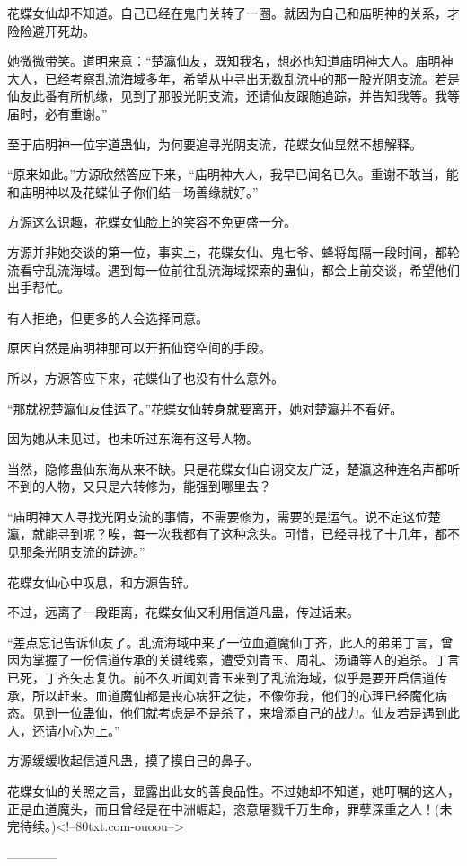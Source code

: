 \begin{this_body}
花蝶女仙却不知道。自己已经在鬼门关转了一圈。就因为自己和庙明神的关系，才险险避开死劫。

她微微带笑。道明来意：“楚瀛仙友，既知我名，想必也知道庙明神大人。庙明神大人，已经考察乱流海域多年，希望从中寻出无数乱流中的那一股光阴支流。若是仙友此番有所机缘，见到了那股光阴支流，还请仙友跟随追踪，并告知我等。我等届时，必有重谢。”

至于庙明神一位宇道蛊仙，为何要追寻光阴支流，花蝶女仙显然不想解释。

“原来如此。”方源欣然答应下来，“庙明神大人，我早已闻名已久。重谢不敢当，能和庙明神以及花蝶仙子你们结一场善缘就好。”

方源这么识趣，花蝶女仙脸上的笑容不免更盛一分。

方源并非她交谈的第一位，事实上，花蝶女仙、鬼七爷、蜂将每隔一段时间，都轮流看守乱流海域。遇到每一位前往乱流海域探索的蛊仙，都会上前交谈，希望他们出手帮忙。

有人拒绝，但更多的人会选择同意。

原因自然是庙明神那可以开拓仙窍空间的手段。

所以，方源答应下来，花蝶仙子也没有什么意外。

“那就祝楚瀛仙友佳运了。”花蝶女仙转身就要离开，她对楚瀛并不看好。

因为她从未见过，也未听过东海有这号人物。

当然，隐修蛊仙东海从来不缺。只是花蝶女仙自诩交友广泛，楚瀛这种连名声都听不到的人物，又只是六转修为，能强到哪里去？

“庙明神大人寻找光阴支流的事情，不需要修为，需要的是运气。说不定这位楚瀛，就能寻到呢？唉，每一次我都有了这种念头。可惜，已经寻找了十几年，都不见那条光阴支流的踪迹。”

花蝶女仙心中叹息，和方源告辞。

不过，远离了一段距离，花蝶女仙又利用信道凡蛊，传过话来。

“差点忘记告诉仙友了。乱流海域中来了一位血道魔仙丁齐，此人的弟弟丁言，曾因为掌握了一份信道传承的关键线索，遭受刘青玉、周礼、汤诵等人的追杀。丁言已死，丁齐矢志复仇。前不久听闻刘青玉来到了乱流海域，似乎是要开启信道传承，所以赶来。血道魔仙都是丧心病狂之徒，不像你我，他们的心理已经魔化病态。见到一位蛊仙，他们就考虑是不是杀了，来增添自己的战力。仙友若是遇到此人，还请小心为上。”

方源缓缓收起信道凡蛊，摸了摸自己的鼻子。

花蝶女仙的关照之言，显露出此女的善良品性。不过她却不知道，她叮嘱的这人，正是血道魔头，而且曾经是在中洲崛起，恣意屠戮千万生命，罪孽深重之人！(未完待续。)<!--80txt.com-ouoou-->

------------

\end{this_body}

